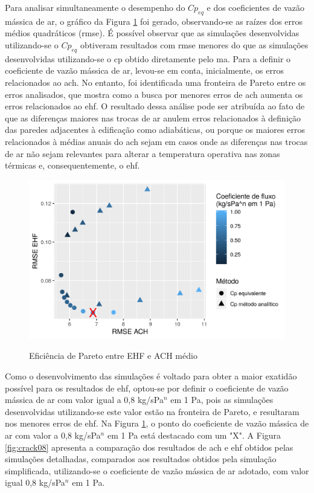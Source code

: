\documentclass[brazil,hardcopy,openany]{ufscthesis} %
\begin{document}
Para analisar simultaneamente o desempenho do $Cp_{eq}$ e dos coeficientes de vazão mássica de ar, o gráfico da Figura \ref{fig:pareto} foi gerado, observando-se as raízes dos erros médios quadráticos (\acrshort{rmse}).
É possível observar que as simulações desenvolvidas utilizando-se o $Cp_{eq}$ obtiveram resultados com \acrshort{rmse} menores do que as simulações desenvolvidas utilizando-se o \acrshort{cp} obtido diretamente pelo \acrlong{ma}.
Para a definir o coeficiente de vazão mássica de ar, levou-se em conta, inicialmente, os erros relacionados ao \acrshort{ach}.
No entanto, foi identificada uma fronteira de Pareto entre os erros analisados, que mostra como a busca por menores erros de \acrshort{ach} aumenta os erros relacionados ao \acrshort{ehf}.
O resultado dessa análise pode ser atribuída ao fato de que as diferenças maiores nas trocas de ar anulem erros relacionados à definição das paredes adjacentes à edificação como adiabáticas, ou porque os maiores erros relacionados à médias anuais do \acrshort{ach} sejam em casos onde as diferenças nas trocas de ar não sejam relevantes para alterar a temperatura operativa nas zonas térmicas e, consequentemente, o \acrshort{ehf}.

\begin{figure}[h]
	\centering
	\caption{Eficiência de Pareto entre EHF e ACH médio}
	\includegraphics[width=1\linewidth]{img/cpeq_pareto.png}
	\label{fig:pareto}
\end{figure}

Como o desenvolvimento das simulações é voltado para obter a maior exatidão possível para os resultados de \acrshort{ehf}, optou-se por definir o coeficiente de vazão mássica de ar com valor igual a 0,8 kg/sPa$^n$ em 1 Pa, pois as simulações desenvolvidas utilizando-se este valor estão na fronteira de Pareto, e resultaram nos menores erros de \acrshort{ehf}.
Na Figura \ref{fig:pareto}, o ponto do coeficiente de vazão mássica de ar com valor a 0,8 kg/sPa$^n$ em 1 Pa está destacado com um "X".
A Figura \ref{fig:crack08} apresenta a comparação dos resultados de \acrshort{ach} e \acrshort{ehf} obtidos pelas simulações detalhadas, comparados aos resultados obtidos pela simulação simplificada, utilizando-se o coeficiente de vazão mássica de ar adotado, com valor igual 0,8 kg/sPa$^n$ em 1 Pa.
\end{document}
